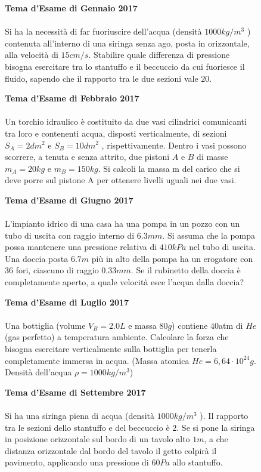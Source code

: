\begin{figure}[h!]
    \textbf{Tema d'Esame di Gennaio 2017}\\ \\
    Si ha la necessità di far fuoriuscire dell'acqua (densità $1000 kg/m^3$
    ) contenuta all'interno di una siringa senza ago, posta in orizzontale, alla velocità di $15 cm/s$.
     Stabilire quale differenza di pressione bisogna esercitare tra lo stantuffo e il beccuccio da cui fuoriesce il
    fluido, sapendo che il rapporto tra le due sezioni vale $20$. 
\end{figure}

\begin{figure}[h!]
    \textbf{Tema d'Esame di Febbraio 2017}\\ \\
    Un torchio idraulico è costituito da due vasi cilindrici comunicanti tra loro e contenenti acqua, disposti verticalmente, di sezioni $S_A =2 dm^2$  e $S_B = 10 dm^2$ , rispettivamente. Dentro i vasi possono scorrere, a tenuta e senza attrito, due pistoni $A$ e $B$ di masse $m_A = 20 kg$ e $m_B = 150 kg$. Si calcoli la massa m del carico che si deve porre sul pistone A per ottenere livelli uguali nei due vasi.
\end{figure}

\begin{figure}[h!]
    \textbf{Tema d'Esame di Giugno 2017}\\ \\
    L’impianto idrico di una casa ha una pompa in un pozzo con un tubo di uscita con raggio interno di $6.3 mm$. Si assuma che la pompa possa mantenere una pressione relativa di $410 kPa$ nel tubo di uscita. Una doccia posta $6.7 m$ più in alto della pompa ha un erogatore con $36$ fori, ciascuno di raggio $0.33 mm$. Se il rubinetto della doccia è completamente aperto, a quale velocità esce l’acqua dalla doccia?
\end{figure}

\begin{figure}[h!]
    \textbf{Tema d'Esame di Luglio 2017}\\ \\
    Una bottiglia (volume $V_B = 2.0 L$ e massa $80 g$) contiene $40$atm di $He$ (gas perfetto) a temperatura ambiente. Calcolare la forza che bisogna esercitare verticalmente sulla bottiglia per tenerla completamente immersa in acqua. (Massa atomica $He = 6,64\cdot 10^{24} g$. Densità dell’acqua $\rho = 1000 kg/m^3$)
\end{figure}

\begin{figure}[h!]
    \textbf{Tema d'Esame di Settembre 2017}\\ \\
    Si ha una siringa piena di acqua (densità $1000 kg/m^3$
). Il rapporto tra le sezioni dello stantuffo e del beccuccio è $2$. Se si pone la siringa in posizione orizzontale sul bordo di un tavolo alto $1 m$, a che distanza orizzontale dal bordo del tavolo il getto colpirà il pavimento, applicando una pressione di $60 Pa$ allo stantuffo.
\end{figure}